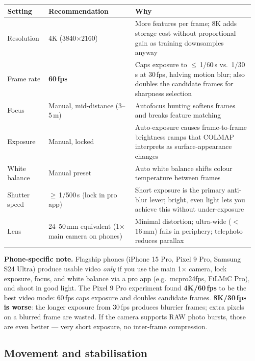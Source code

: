\begin{center}
\begin{tabular}{@{}L{3.2cm}L{4.8cm}L{5.8cm}@{}}
\toprule
\textbf{Setting} & \textbf{Recommendation} & \textbf{Why} \\
\midrule
Resolution     & 4K (3840$\times$2160)           & More features per frame; 8K adds storage cost without proportional gain as training downsamples anyway \\
Frame rate     & \textbf{60\,fps}                 & Caps exposure to $\leq$\,1/60\,s vs.\ 1/30\,s at 30\,fps, halving motion blur; also doubles the candidate frames for sharpness selection \\
Focus          & Manual, mid-distance (3--5\,m)  & Autofocus hunting softens frames and breaks feature matching \\
Exposure       & Manual, locked                  & Auto-exposure causes frame-to-frame brightness ramps that COLMAP interprets as surface-appearance changes \\
White balance  & Manual preset                   & Auto white balance shifts colour temperature between frames \\
Shutter speed  & $\geq$\,1/500\,s (lock in pro app) & Short exposure is the primary anti-blur lever; bright, even light lets you achieve this without under-exposure \\
Lens           & 24--50\,mm equivalent (1$\times$ main camera on phones) & Minimal distortion; ultra-wide ($<$16\,mm) fails in periphery; telephoto reduces parallax \\
\bottomrule
\end{tabular}
\end{center}

\medskip
\noindent\textbf{Phone-specific note.}  Flagship phones (iPhone 15 Pro,
Pixel 9 Pro, Samsung S24 Ultra) produce usable video \emph{only} if you use
the main 1$\times$ camera, lock exposure, focus, and white balance via a pro
app (e.g.\ mcpro24fps, FiLMiC Pro), and shoot in good light.  The Pixel 9 Pro
experiment found \textbf{4K/60\,fps} to be the best video mode: 60\,fps caps
exposure and doubles candidate frames.  \textbf{8K/30\,fps is worse}: the
longer exposure from 30\,fps produces blurrier frames; extra pixels on a
blurred frame are wasted.  If the camera supports RAW photo bursts, those are
even better --- very short exposure, no inter-frame compression.

\subsection{Movement and stabilisation}
\label{sec:pb-movement}

